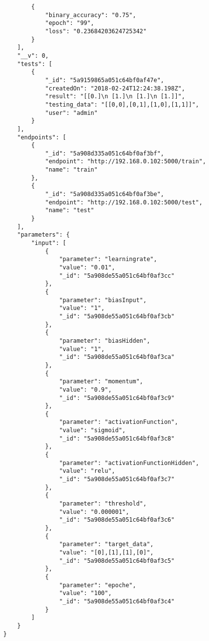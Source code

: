 \begin{lstlisting}
            {
                "binary_accuracy": "0.75",
                "epoch": "99",
                "loss": "0.23684203624725342"
            }
        ],
        "__v": 0,
        "tests": [
            {
                "_id": "5a9159865a051c64bf0af47e",
                "createdOn": "2018-02-24T12:24:38.198Z",
                "result": "[[0.]\n [1.]\n [1.]\n [1.]]",
                "testing_data": "[[0,0],[0,1],[1,0],[1,1]]",
                "user": "admin"
            }
        ],
        "endpoints": [
            {
                "_id": "5a908d335a051c64bf0af3bf",
                "endpoint": "http://192.168.0.102:5000/train",
                "name": "train"
            },
            {
                "_id": "5a908d335a051c64bf0af3be",
                "endpoint": "http://192.168.0.102:5000/test",
                "name": "test"
            }
        ],
        "parameters": {
            "input": [
                {
                    "parameter": "learningrate",
                    "value": "0.01",
                    "_id": "5a908de55a051c64bf0af3cc"
                },
                {
                    "parameter": "biasInput",
                    "value": "1",
                    "_id": "5a908de55a051c64bf0af3cb"
                },
                {
                    "parameter": "biasHidden",
                    "value": "1",
                    "_id": "5a908de55a051c64bf0af3ca"
                },
                {
                    "parameter": "momentum",
                    "value": "0.9",
                    "_id": "5a908de55a051c64bf0af3c9"
                },
                {
                    "parameter": "activationFunction",
                    "value": "sigmoid",
                    "_id": "5a908de55a051c64bf0af3c8"
                },
                {
                    "parameter": "activationFunctionHidden",
                    "value": "relu",
                    "_id": "5a908de55a051c64bf0af3c7"
                },
                {
                    "parameter": "threshold",
                    "value": "0.000001",
                    "_id": "5a908de55a051c64bf0af3c6"
                },
                {
                    "parameter": "target_data",
                    "value": "[0],[1],[1],[0]",
                    "_id": "5a908de55a051c64bf0af3c5"
                },
                {
                    "parameter": "epoche",
                    "value": "100",
                    "_id": "5a908de55a051c64bf0af3c4"
                }
            ]
        }
    }
    
\end{lstlisting}


